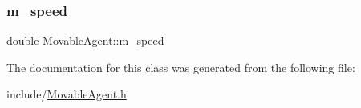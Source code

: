 \subsubsection{\texorpdfstring{m\_speed}{m\_speed}}
{\footnotesize\ttfamily double Movable\+Agent\+::m\+\_\+speed\hspace{0.3cm}{\ttfamily [private]}}



The documentation for this class was generated from the following file\+:\begin{DoxyCompactItemize}
\item 
include/\mbox{\hyperlink{_movable_agent_8h}{Movable\+Agent.\+h}}\end{DoxyCompactItemize}
